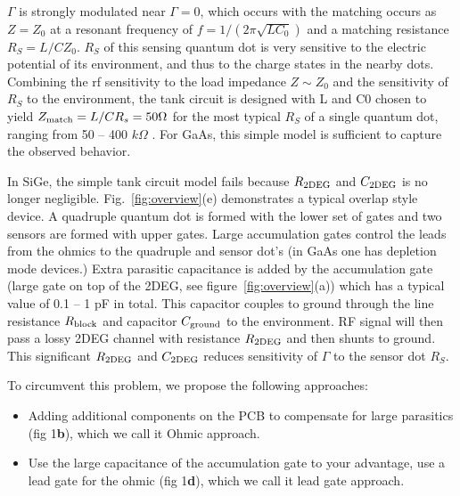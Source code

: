 \documentclass[twocolumn]{article}
\begin{document}
$\Gamma$ is strongly modulated near $\Gamma = 0$, which occurs with the matching occurs as $Z=Z_0$ at a resonant frequency of $f=1/(2\pi \sqrt{LC_0})$ and a matching resistance $R_S=L/CZ_0$. $R_S$ of this sensing quantum dot is very sensitive to the electric potential of its environment, and thus to the charge states in the nearby dots. Combining the rf sensitivity to the load impedance $Z\sim Z_0$ and the sensitivity of $R_S$ to the environment, the tank circuit is designed with L and C0 chosen to yield $Z_{\rm match} = L/CR_s= 50 \Omega$  for the most typical $R_S$ of a single quantum dot, ranging from 50 -- 400 $k\Omega$
.   For GaAs, this simple model is sufficient to capture the observed behavior. 

In SiGe, the simple tank circuit model fails because $R_{\rm 2DEG}$ and $C_{\rm 2DEG}$ is no longer negligible.	Fig.\ \ref{fig:overview}(e) demonstrates a typical overlap style device.  A quadruple quantum dot is formed with the lower set of gates and two sensors are formed with upper gates. Large accumulation gates control the leads from the ohmics to the quadruple and sensor dot’s (in GaAs one has depletion mode devices.)
Extra parasitic capacitance is added by the accumulation gate (large gate on top of the 2DEG, see figure\ \ref{fig:overview}(a)) which has a typical value of \color{red} 0.1 -- 1 pF \color{black} in total. This capacitor couples to ground through the line resistance $R_{\rm block}$ and capacitor $C_{\rm ground}$ to the environment. RF signal will then pass a lossy 2DEG channel with resistance $R_{\rm 2DEG}$ and then shunts to ground. This significant $R_{\rm 2DEG}$ and $C_{\rm 2DEG}$ reduces sensitivity of $\Gamma$ to the sensor dot $R_S$. %


To circumvent this problem, we propose the following approaches:
\begin{itemize}
	\item Adding additional components on the PCB to compensate for large parasitics (fig 1\textbf{b}), which we call it Ohmic approach.
	\item Use the large capacitance of the accumulation gate to your advantage, use a lead gate for the ohmic (fig 1\textbf{d}), which we call it lead gate approach.
\end{itemize}
\end{document}
